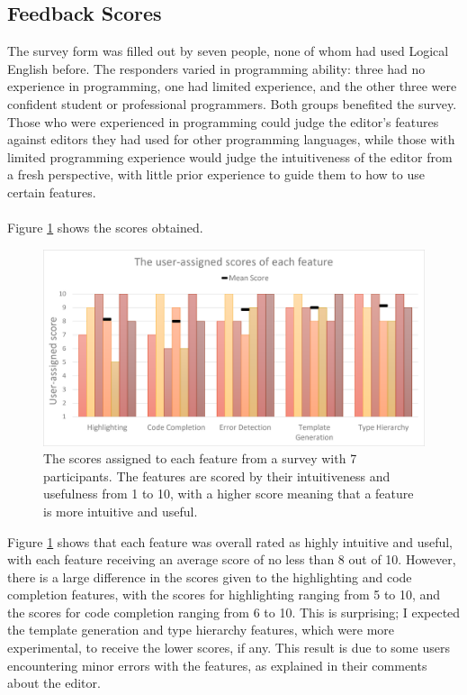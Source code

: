 \documentclass[../main.tex]{subfiles}
\begin{document}
\subsection{Feedback Scores}
The survey form was filled out by seven people, none of whom had used Logical English before. The responders varied in programming ability: three had no experience in programming, one had limited experience, and the other three were confident student or professional programmers. Both groups benefited the survey. Those who were experienced in programming could judge the editor's features against editors they had used for other programming languages, while those with limited programming experience would judge the intuitiveness of the editor from a fresh perspective, with little prior experience to guide them to how to use certain features.
\\
\\
Figure \ref{fig:scores} shows the scores obtained.
\begin{figure}[h!]
\centering
\includegraphics[width = \linewidth]{figures/features-hist-2.png}
\caption{The scores assigned to each feature from a survey with 7 participants. The features are scored by their intuitiveness and usefulness from 1 to 10, with a higher score meaning that a feature is more intuitive and useful.}
\label{fig:scores}
\end{figure}
Figure \ref{fig:scores} shows that each feature was overall rated as highly intuitive and useful, with each feature receiving an average score of no less than 8 out of 10. However, there is a large difference in the scores given to the highlighting and code completion features, with the scores for highlighting ranging from 5 to 10, and the scores for code completion ranging from 6 to 10. This is surprising; I expected the template generation and type hierarchy features, which were more experimental, to receive the lower scores, if any. This result is due to some users encountering minor errors with the features, as explained in their comments about the editor.
\end{document}
